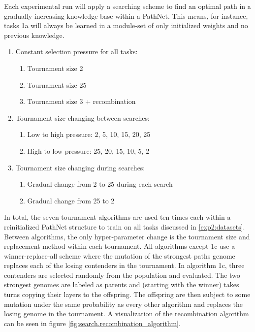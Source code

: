 Each experimental run will apply a searching scheme to find an optimal path in a gradually increasing knowledge base within a PathNet. This means, for instance, tasks 1a will always be learned in a module-set of only initialized weights and no previous knowledge. 
\begin{enumerate}
    \item Constant selection pressure for all tasks:
    \begin{enumerate}
        \item Tournament size 2
        \item Tournament size 25
        \item Tournament size 3 + recombination
    \end{enumerate}
    \item Tournament size changing between searches:
    \begin{enumerate}
        \item Low to high pressure: 2, 5, 10, 15, 20, 25
        \item High to low pressure: 25, 20, 15, 10, 5, 2
    \end{enumerate}
    \item Tournament size changing during searches:
    \begin{enumerate}
        \item Gradual change from 2 to 25 during each search
        \item Gradual change from 25 to 2 
    \end{enumerate}
\end{enumerate}
In total, the seven tournament algorithms are used ten times each within a reinitialized PathNet structure to train on all tasks discussed in \ref{exp2:datasets}. Between algorithms, the only hyper-parameter change is the tournament size and replacement method within each tournament. All algorithms except 1c use a winner-replace-all scheme where the mutation of the strongest paths genome replaces each of the losing contenders in the tournament. In algorithm 1c, three contenders are selected randomly from the population and evaluated. The two strongest genomes are labeled as parents and (starting with the winner) takes turns copying their layers to the offspring. The offspring are then subject to some mutation under the same probability as every other algorithm and replaces the losing genome in the tournament. A visualization of the recombination algorithm can be seen in figure \ref{fig:search.recombination_algorithm}.
